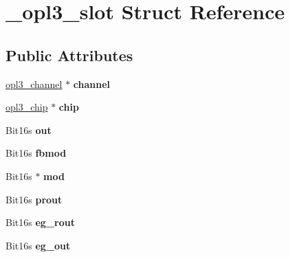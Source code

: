 \hypertarget{struct__opl3__slot}{\section{\-\_\-opl3\-\_\-slot Struct Reference}
\label{struct__opl3__slot}
}
\subsection*{Public Attributes}
\begin{DoxyCompactItemize}
\item 
\hypertarget{struct__opl3__slot_af4a592f53dc9af3de2f0666adea286a3}{\hyperlink{struct__opl3__channel}{opl3\-\_\-channel} $\ast$ {\bfseries channel}}\label{struct__opl3__slot_af4a592f53dc9af3de2f0666adea286a3}

\item 
\hypertarget{struct__opl3__slot_a530444a2eb87d60c3e284224176127ff}{\hyperlink{struct__opl3__chip}{opl3\-\_\-chip} $\ast$ {\bfseries chip}}\label{struct__opl3__slot_a530444a2eb87d60c3e284224176127ff}

\item 
\hypertarget{struct__opl3__slot_a5ff91a16a7737a1770c7e08655be95e5}{Bit16s {\bfseries out}}\label{struct__opl3__slot_a5ff91a16a7737a1770c7e08655be95e5}

\item 
\hypertarget{struct__opl3__slot_ab347349dff265d97e551e127b3d478a5}{Bit16s {\bfseries fbmod}}\label{struct__opl3__slot_ab347349dff265d97e551e127b3d478a5}

\item 
\hypertarget{struct__opl3__slot_a3bf906053861b4683ae2f423d444edeb}{Bit16s $\ast$ {\bfseries mod}}\label{struct__opl3__slot_a3bf906053861b4683ae2f423d444edeb}

\item 
\hypertarget{struct__opl3__slot_abdaed4cb9bab2724032687635eed4372}{Bit16s {\bfseries prout}}\label{struct__opl3__slot_abdaed4cb9bab2724032687635eed4372}

\item 
\hypertarget{struct__opl3__slot_a2c6a830633c84790a8ab20b8c2caa73c}{Bit16s {\bfseries eg\-\_\-rout}}\label{struct__opl3__slot_a2c6a830633c84790a8ab20b8c2caa73c}

\item 
\hypertarget{struct__opl3__slot_ad7a4c11e7be6b0172c73cc161c138f6d}{Bit16s {\bfseries eg\-\_\-out}}\label{struct__opl3__slot_ad7a4c11e7be6b0172c73cc161c138f6d}


\end{DoxyCompactItemize}
